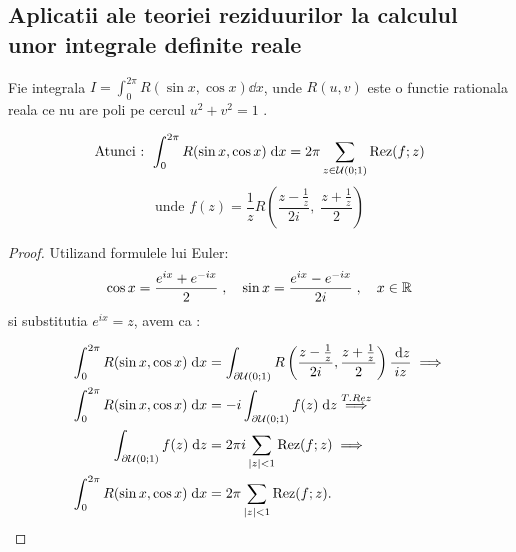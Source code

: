 \subsection{Aplicatii ale teoriei reziduurilor la calculul unor integrale definite reale}

\begin{tip}[1]
    Fie integrala $\displaystyle I=\int_{0}^{2\pi} R(\sin x, \cos x) \dd x$, unde
    $R(u,v)$ este o functie rationala reala ce nu are poli pe cercul $u^2+v^2=1$ .

    \[
        \text{Atunci : } \int_{0}^{2\pi} R(\sin x , \cos x) \; \mathrm{d} x =
        2\pi \sum_{z\in \mathcal{U}(0;1)} \operatorname{Rez}(f;z)
    \]
    \[
        \text{unde } f(z) = \frac{1}{z} R\left(\frac{z-\frac{1}{z}}{2i},\; \frac{z+\frac{1}{z}}{2} \right)
    \]

    \begin{proof}
        Utilizand formulele lui Euler:
        \[
            \cos x = \frac{e^{ix}+e^{-ix}}{2}\; ,\quad \sin x = \frac{e^{ix}-e^{-ix}}{2i}\; , \quad x \in \mathbb{R}
        \]
        si substitutia $e^{ix}=z$, avem ca :

        \begin{align*}
            \int_{0}^{2\pi} R(\sin x , \cos x) \; \mathrm{d} x &=
                \int_{\partial \mathcal{U}(0;1)}
                    R\left(\frac{z-\frac{1}{z}}{2i}, \frac{z+\frac{1}{z}}{2} \right)
                \frac{\; \mathrm{d} z}{iz}
            \implies
                        \\
                        \int_{0}^{2\pi} R(\sin x , \cos x) \; \mathrm{d} x
                            &= -i \int_{\partial \mathcal{U}(0;1)} f(z) \; \mathrm{d} z
            \overset{T.Rez}{\implies}
                        \\
                        \int_{\partial \mathcal{U}(0;1)} f(z) \; \mathrm{d} z &=
                2\pi i \sum_{|z|<1} \operatorname{Rez}(f;z)
            \implies
                        \\
                        \int_{0}^{2\pi} R(\sin x , \cos x) \; \mathrm{d} x &=
                2\pi \sum_{|z|<1} \operatorname{Rez}(f;z) .
        \end{align*}


    \end{proof}
\end{tip}


